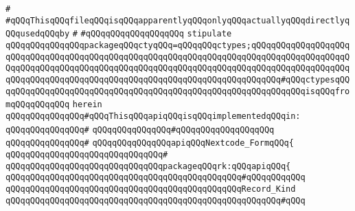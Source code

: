 \verb|#|\newline
\newline
\newline
\newline
\newline
\verb|#qQQqThisqQQqfileqQQqisqQQqapparentlyqQQqonlyqQQqactuallyqQQqdirectlyqQQqusedqQQqby|\newline
\verb|#|\newline
\verb|#qQQqqQQqqQQqqQQqqQQq|\newline
\newline
\newline
\verb|stipulate|\newline
\verb|qQQqqQQqqQQqqQQqpackageqQQqctyqQQq=qQQqqQQqctypes;qQQqqQQqqQQqqQQqqQQqqQQqqQQqqQQqqQQqqQQqqQQqqQQqqQQqqQQqqQQqqQQqqQQqqQQqqQQqqQQqqQQqqQQqqQQqqQQqqQQqqQQqqQQqqQQqqQQqqQQqqQQqqQQqqQQqqQQqqQQqqQQqqQQqqQQqqQQqqQQqqQQqqQQqqQQqqQQqqQQqqQQqqQQqqQQqqQQqqQQqqQQqqQQqqQQqqQQq#qQQqctypesqQQqqQQqqQQqqQQqqQQqqQQqqQQqqQQqqQQqqQQqqQQqqQQqqQQqqQQqqQQqqQQqisqQQqfromqQQqqQQqqQQq|\newline
\verb|herein|\newline
\newline
\verb|qQQqqQQqqQQqqQQq#qQQqThisqQQqapiqQQqisqQQqimplementedqQQqin:|\newline
\verb|qQQqqQQqqQQqqQQq#|\newline
\verb|qQQqqQQqqQQqqQQq#qQQqqQQqqQQqqQQqqQQq|\newline
\verb|qQQqqQQqqQQqqQQq#|\newline
\verb|qQQqqQQqqQQqqQQqapiqQQqNextcode_FormqQQq{|\newline
\verb|qQQqqQQqqQQqqQQqqQQqqQQqqQQqqQQq#|\newline
\verb|qQQqqQQqqQQqqQQqqQQqqQQqqQQqqQQqpackageqQQqrk:qQQqapiqQQq{|\newline
\verb|qQQqqQQqqQQqqQQqqQQqqQQqqQQqqQQqqQQqqQQqqQQqqQQq#qQQqqQQqqQQq|\newline
\verb|qQQqqQQqqQQqqQQqqQQqqQQqqQQqqQQqqQQqqQQqqQQqqQQqRecord_Kind|\newline
\verb|qQQqqQQqqQQqqQQqqQQqqQQqqQQqqQQqqQQqqQQqqQQqqQQqqQQqqQQq#qQQq|\newline
